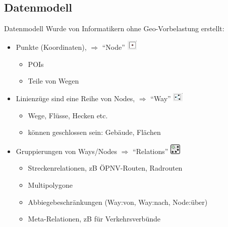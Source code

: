 \documentclass{beamer}
\begin{document}
\subsection{Datenmodell}

\begin{frame}{Datenmodell}
Wurde von Informatikern ohne Geo-Vorbelastung erstellt:
\begin{itemize}
  \item Punkte (Koordinaten), $\Rightarrow$ "`Node"' \includegraphics[width=0.5cm]{node.png}
  \begin{itemize}
    \item POIs
    \pause
    \item Teile von Wegen
  \end{itemize}
  \item Linienzüge sind eine Reihe von Nodes, $\Rightarrow$ "`Way"' \includegraphics[width=0.5cm]{way.png}
  \begin{itemize}
    \item Wege, Flüsse, Hecken etc.
    \item können geschlossen sein: Gebäude, Flächen
  \end{itemize}
  \pause
  \item Gruppierungen von Ways/Nodes $\Rightarrow$ "`Relations"' \includegraphics[width=0.5cm]{relation.png}
  \begin{itemize}
    \item Streckenrelationen, zB ÖPNV-Routen, Radrouten
    \item Multipolygone 
    \item Abbiegebeschränkungen (Way:von, Way:nach, Node:über)
    \item Meta-Relationen, zB für Verkehrsverbünde
  \end{itemize}
\end{itemize}

\end{frame}
\end{document}
